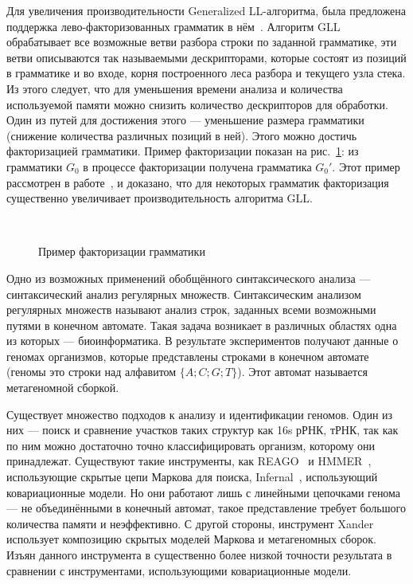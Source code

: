 Для увеличения производительности Generalized LL-алгоритма, была предложена поддержка 
лево-факторизованных грамматик в нём~\cite{scott2016structuring}.
Алгоритм GLL обрабатывает все возможные ветви разбора строки по заданной грамматике, 
эти ветви описываются так называемыми дескрипторами, которые состоят из позиций в грамматике и во входе,
корня построенного леса разбора и текущего узла стека. Из этого следует, что для уменьшения времени анализа и количества используемой памяти
можно снизить количество дескрипторов для обработки. Один из путей для достижения этого --- 
уменьшение размера грамматики (снижение количества различных позиций в ней).
Этого можно достичь факторизацией грамматики. Пример факторизации показан на рис.~\ref{fig:ExampleOfFactorization}:
из грамматики $G_0$ в процессе факторизации получена грамматика $G_0'$.
Этот пример рассмотрен в работе~\cite{scott2016structuring}, и доказано, что для некоторых грамматик факторизация 
существенно увеличивает производительность алгоритма GLL.
\begin{figure}
	\centering
	~
	\caption{Пример факторизации грамматики}
	\label{fig:ExampleOfFactorization}
\end{figure}

Одно из возможных применений обобщённого синтаксического анализа --- синтаксический анализ регулярных множеств.
Синтаксическим анализом регулярных множеств называют анализ строк, заданных всеми возможными путями в конечном автомате.
Такая задача возникает в различных областях одна из которых --- биоинформатика. В результате экспериментов 
получают данные о геномах организмов, которые представлены строками в конечном автомате (геномы это строки над алфавитом $\{A;C; G; T\}$).
Этот автомат называется метагеномной сборкой.

Существует множество подходов к анализу и идентификации геномов. Один из них --- поиск и сравнение участков таких структур как
16s рРНК, тРНК, так как по ним можно достаточно точно классифицировать организм, которому они принадлежат.
Существуют такие инструменты, как REAGO~\cite{reago} и HMMER~\cite{hmmer}, использующие скрытые цепи Маркова для поиска, 
Infernal~\cite{Infernal}, использующий ковариационные модели. Но они работают лишь с линейными цепочками генома ---
не объединёнными в конечный автомат, такое представление требует большого количества памяти и неэффективно.
С другой стороны, инструмент Xander~\cite{xander} использует композицию скрытых моделей Маркова и метагеномных сборок.
Изъян данного инструмента в существенно более низкой точности результата в сравнении с инструментами, использующими ковариационные модели.

